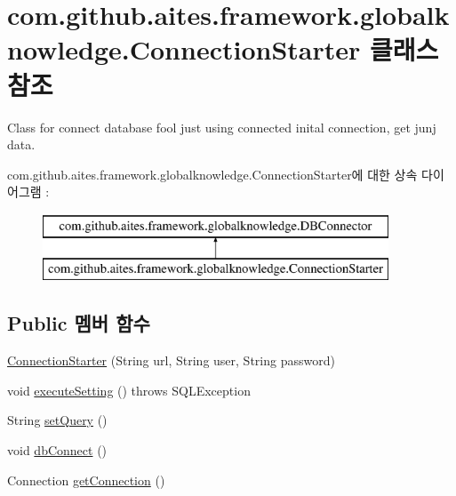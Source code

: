 \hypertarget{classcom_1_1github_1_1aites_1_1framework_1_1globalknowledge_1_1_connection_starter}{}\section{com.\+github.\+aites.\+framework.\+globalknowledge.\+Connection\+Starter 클래스 참조}
\label{classcom_1_1github_1_1aites_1_1framework_1_1globalknowledge_1_1_connection_starter}


Class for connect database fool just using connected inital connection, get junj data.  


com.\+github.\+aites.\+framework.\+globalknowledge.\+Connection\+Starter에 대한 상속 다이어그램 \+: \begin{figure}[H]
\begin{center}
\leavevmode
\includegraphics[height=2.000000cm]{classcom_1_1github_1_1aites_1_1framework_1_1globalknowledge_1_1_connection_starter}
\end{center}
\end{figure}
\subsection*{Public 멤버 함수}
\begin{DoxyCompactItemize}
\item 
\mbox{\hyperlink{classcom_1_1github_1_1aites_1_1framework_1_1globalknowledge_1_1_connection_starter_a1079547a70ed3aa50a2b092de2d3fa47}{Connection\+Starter}} (String url, String user, String password)
\item 
void \mbox{\hyperlink{classcom_1_1github_1_1aites_1_1framework_1_1globalknowledge_1_1_connection_starter_a9a24b97ed99d5cb1464c17ee9f79c5ae}{execute\+Setting}} ()  throws S\+Q\+L\+Exception 
\item 
String \mbox{\hyperlink{classcom_1_1github_1_1aites_1_1framework_1_1globalknowledge_1_1_connection_starter_aab751c4626497947cfe21433943dddb0}{set\+Query}} ()
\item 
void \mbox{\hyperlink{classcom_1_1github_1_1aites_1_1framework_1_1globalknowledge_1_1_d_b_connector_a108808207e33b613b470855bb2be9223}{db\+Connect}} ()
\item 
Connection \mbox{\hyperlink{classcom_1_1github_1_1aites_1_1framework_1_1globalknowledge_1_1_d_b_connector_a94ff414cd6c3dcc402787d96136b5788}{get\+Connection}} ()
\end{DoxyCompactItemize}
